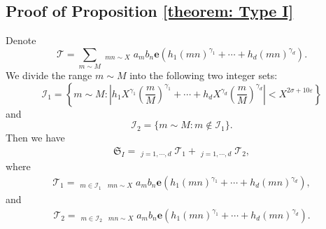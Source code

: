 \documentclass[12pt, reqno, twoside, letterpaper]{amsart}
\numberwithin{equation}{section}
\newcommand{\cT}{\ensuremath{\mathcal{T}}}
\theoremstyle{customthm}
\theoremstyle{customrem}
\begin{document}
\subsection{Proof of Proposition \ref{theorem: Type I}}

Denote
$$
\cT=\sum_{m\sim M}\mathop{\sum_{n\sim N}}_{mn\sim X}a_mb_n\mathbf{e}\left(h_1(mn)^{\gamma_1}
+\cdots+h_d(mn)^{\gamma_d}\right).
$$
We divide the range $m\sim M$ into the following two integer sets:
$$
\mathcal{I}_1=\left\{m\sim M: \left|h_1X^{\gamma_1}\left(\frac{m}{M}\right)^{\gamma_1}
+\cdots+h_dX^{\gamma_d}\left(\frac{m}{M}\right)^{\gamma_d}\right|<X^{2\sigma+10\varepsilon}\right\}
$$
and
$$
\mathcal{I}_2=\{m\sim M: m\notin\mathcal{I}_1\}.
$$
Then we have
\begin{align}\label{eq: SI=T1+T2}
\mathfrak{S}_{I}=\mathop{\sum_{1<|h_j|<X^{\delta_j}\mathcal{L}}}_{j=1,\cdots,d}\cT_1
+\mathop{\sum_{1<|h_j|<X^{\delta_j}\mathcal{L}}}_{j=1,\cdots,d}\cT_2,
\end{align}
where
\begin{align*}
\cT_1=\mathop{\sum_{m\sim M}}_{m\in\mathcal{I}_1}\mathop{\sum_{n\sim N}}_{mn\sim X}a_mb_n
\mathbf{e}\left(h_1(mn)^{\gamma_1}+\cdots+h_d(mn)^{\gamma_d}\right),
\end{align*}
and
\begin{align*}
\cT_2=\mathop{\sum_{m\sim M}}_{m\in\mathcal{I}_2}\mathop{\sum_{n\sim N}}_{mn\sim X}a_mb_n
\mathbf{e}\left(h_1(mn)^{\gamma_1}+\cdots+h_d(mn)^{\gamma_d}\right).
\end{align*}
\end{document}
